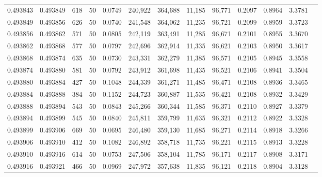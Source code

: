 \begin{tabular}{rrrrrrrrrrrrr}
0.493843 & 0.493849 &   618 &  50 &                                     0.0749 & 240,922 & 364,688 &  11,185 &  96,771 & 0.2097 & 0.8964 & 3.3781 \\
0.493849 & 0.493856 &   626 &  50 &                                     0.0740 & 241,548 & 364,062 &  11,235 &  96,721 & 0.2099 & 0.8959 & 3.3723 \\
0.493856 & 0.493862 &   571 &  50 &                                     0.0805 & 242,119 & 363,491 &  11,285 &  96,671 & 0.2101 & 0.8955 & 3.3670 \\
0.493862 & 0.493868 &   577 &  50 &                                     0.0797 & 242,696 & 362,914 &  11,335 &  96,621 & 0.2103 & 0.8950 & 3.3617 \\
0.493868 & 0.493874 &   635 &  50 &                                     0.0730 & 243,331 & 362,279 &  11,385 &  96,571 & 0.2105 & 0.8945 & 3.3558 \\
0.493874 & 0.493880 &   581 &  50 &                                     0.0792 & 243,912 & 361,698 &  11,435 &  96,521 & 0.2106 & 0.8941 & 3.3504 \\
0.493880 & 0.493884 &   427 &  50 &                                     0.1048 & 244,339 & 361,271 &  11,485 &  96,471 & 0.2108 & 0.8936 & 3.3465 \\
0.493884 & 0.493888 &   384 &  50 &                                     0.1152 & 244,723 & 360,887 &  11,535 &  96,421 & 0.2108 & 0.8932 & 3.3429 \\
0.493888 & 0.493894 &   543 &  50 &                                     0.0843 & 245,266 & 360,344 &  11,585 &  96,371 & 0.2110 & 0.8927 & 3.3379 \\
0.493894 & 0.493899 &   545 &  50 &                                     0.0840 & 245,811 & 359,799 &  11,635 &  96,321 & 0.2112 & 0.8922 & 3.3328 \\
0.493899 & 0.493906 &   669 &  50 &                                     0.0695 & 246,480 & 359,130 &  11,685 &  96,271 & 0.2114 & 0.8918 & 3.3266 \\
0.493906 & 0.493910 &   412 &  50 &                                     0.1082 & 246,892 & 358,718 &  11,735 &  96,221 & 0.2115 & 0.8913 & 3.3228 \\
0.493910 & 0.493916 &   614 &  50 &                                     0.0753 & 247,506 & 358,104 &  11,785 &  96,171 & 0.2117 & 0.8908 & 3.3171 \\
0.493916 & 0.493921 &   466 &  50 &                                     0.0969 & 247,972 & 357,638 &  11,835 &  96,121 & 0.2118 & 0.8904 & 3.3128 \\

\end{tabular}
